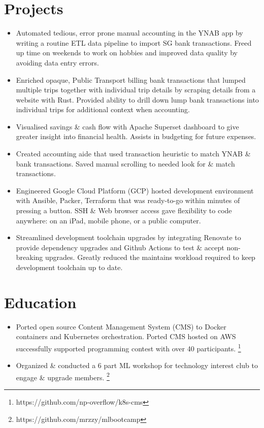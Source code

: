 \section{Projects}
\begin{itemize}
  \item Automated tedious, error prone manual accounting in the YNAB app by writing a routine ETL data pipeline to import SG bank transactions. 
    Freed up time on weekends to work on hobbies and improved data quality by avoiding data entry errors.
  \item Enriched opaque, Public Transport billing bank transactions that lumped multiple trips together with individual trip details by scraping details from a website with Rust.
    Provided ability to drill down lump bank transactions into individual trips for additional context when accounting.
  \item Visualised savings \& cash flow with Apache Superset dashboard to give greater insight into financial health. Assists in budgeting for future expenses.
  \item Created accounting aide that used transaction heuristic to match YNAB \& bank transactions. Saved manual scrolling to needed look for \& match transactions.
\end{itemize}

\begin{itemize}
  \item Engineered Google Cloud Platform (GCP) hosted development environment with Ansible, Packer, Terraform that was ready-to-go within minutes of pressing a button. 
    SSH \& Web browser access gave flexibility to code anywhere: on an iPad, mobile phone, or a public computer.
  \item Streamlined development toolchain upgrades by integrating Renovate to provide dependency upgrades and Github Actions to test \& accept non-breaking upgrades. Greatly reduced the maintains workload required to keep development toolchain up to date.
\end{itemize}
  
\section{Education}
\begin{itemize}
  \item Ported open source Content Management System (CMS) to Docker containers and Kubernetes orchestration.
    Ported CMS hosted on AWS successfully supported programming contest with over 40 participants. \footnote{https://github.com/np-overflow/k8s-cms}
  \item Organized \& conducted a 6 part ML workshop for technology interest club to engage \& upgrade members. \footnote{https://github.com/mrzzy/mlbootcamp}
\end{itemize}

